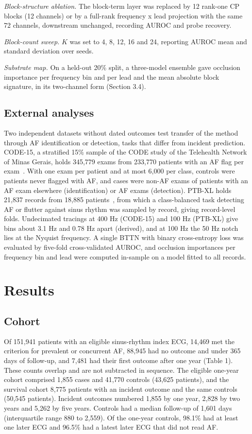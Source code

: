 \documentclass[preprint,12pt]{elsarticle}
\begin{document}
\textit{Block-structure ablation.} The block-term layer was replaced by 12 rank-one CP blocks (12 channels) or by a full-rank frequency x lead projection with the same 72 channels, downstream unchanged, recording AUROC and probe recovery.

\textit{Block-count sweep.} $K$ was set to 4, 8, 12, 16 and 24, reporting AUROC mean and standard deviation over seeds.

\textit{Substrate map.} On a held-out 20\% split, a three-model ensemble gave occlusion importance per frequency bin and per lead and the mean absolute block signature, in its two-channel form (Section 3.4).

\subsection{External analyses}

Two independent datasets without dated outcomes test transfer of the method through AF identification or detection, tasks that differ from incident prediction. CODE-15, a stratified 15\% sample of the CODE study of the Telehealth Network of Minas Gerais, holds 345,779 exams from 233,770 patients with an AF flag per exam~\cite{ribeiro2021code15,ribeiro2020}. With one exam per patient and at most 6,000 per class, controls were patients never flagged with AF, and cases were non-AF exams of patients with an AF exam elsewhere (identification) or AF exams (detection). PTB-XL holds 21,837 records from 18,885 patients~\cite{wagner2020}, from which a class-balanced task detecting AF or flutter against sinus rhythm was sampled by record, giving record-level folds. Undecimated tracings at 400 Hz (CODE-15) and 100 Hz (PTB-XL) give bins about 3.1 Hz and 0.78 Hz apart (derived), and at 100 Hz the 50 Hz notch lies at the Nyquist frequency. A single BTTN with binary cross-entropy loss was evaluated by five-fold cross-validated AUROC, and occlusion importances per frequency bin and lead were computed in-sample on a model fitted to all records.

\section{Results}

\subsection{Cohort}

Of 151,941 patients with an eligible sinus-rhythm index ECG, 14,469 met the criterion for prevalent or concurrent AF, 88,945 had no outcome and under 365 days of follow-up, and 7,481 had their first outcome after one year (Table 1). These counts overlap and are not subtracted in sequence. The eligible one-year cohort comprised 1,855 cases and 41,770 controls (43,625 patients), and the survival cohort 8,775 patients with an incident outcome and the same controls (50,545 patients). Incident outcomes numbered 1,855 by one year, 2,828 by two years and 5,262 by five years. Controls had a median follow-up of 1,601 days (interquartile range 880 to 2,559). Of the one-year controls, 98.1\% had at least one later ECG and 96.5\% had a latest later ECG that did not read AF.
\end{document}

